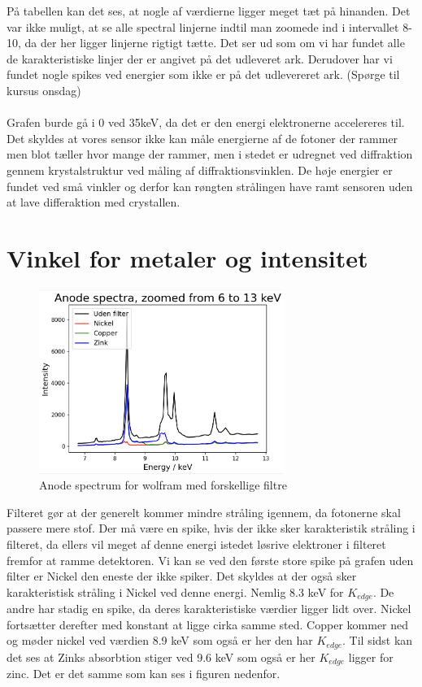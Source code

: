 \documentclass[a4paper,twoside]{article}
\begin{document}
På tabellen kan det ses, at nogle af værdierne ligger meget tæt på hinanden. Det var ikke muligt, at se alle spectral linjerne indtil man zoomede ind i intervallet 8-10, da der her ligger linjerne rigtigt tætte. Det ser ud som om vi har fundet alle de karakteristiske linjer der er angivet på det udleveret ark. Derudover har vi fundet nogle spikes ved energier som ikke er på det udlevereret ark. (Spørge til kursus onsdag)\\
\\Grafen burde gå i 0 ved 35keV, da det er den energi elektronerne accelereres til. Det skyldes at vores sensor ikke kan måle energierne af de fotoner der rammer men blot tæller hvor mange der rammer, men i stedet er udregnet ved diffraktion gennem krystalstruktur ved måling af diffraktionsvinklen. De høje energier er fundet ved små vinkler og derfor kan røngten strålingen have ramt sensoren uden at lave differaktion med crystallen.
\section{Vinkel for metaler og intensitet}
\begin{figure}[H]
\begin{centering}
\includegraphics[height=6cm]{Anode spectra.png}
\hspace{1cm}
\par\end{centering}
\caption{\label{cap:2ien} Anode spectrum for wolfram med forskellige filtre }
\end{figure}
Filteret gør at der generelt kommer mindre stråling igennem, da  fotonerne skal passere mere stof. Der må være en spike, hvis der ikke sker karakteristik stråling i filteret, da ellers vil meget af denne energi istedet løsrive elektroner i filteret fremfor at ramme detektoren. Vi kan se ved den første store spike på grafen uden filter er Nickel den eneste der ikke spiker. Det skyldes at der også sker karakteristisk stråling i Nickel ved denne energi. Nemlig 8.3 keV for $K_{edge}$. De andre har stadig en spike, da deres karakteristiske værdier ligger lidt over. Nickel fortsætter derefter med konstant at ligge cirka samme sted. Copper kommer ned og møder nickel ved værdien 8.9 keV som også er her den har $K_{edge}$. Til sidst kan det ses at Zinks absorbtion stiger ved 9.6 keV som også er her $K_{edge}$ ligger for zinc. Det er det samme som kan ses i figuren nedenfor. 
\end{document}
